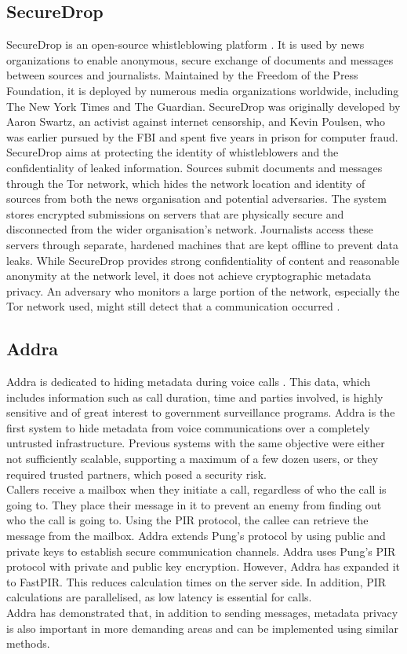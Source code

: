 \documentclass[a4paper]{article}
\begin{document}
\subsection{SecureDrop}
SecureDrop \citep{securedrop} is an open-source whistleblowing platform \citep{berret2016guide}. It is used by news organizations to enable anonymous, secure exchange of documents and messages between sources and journalists. Maintained by the Freedom of the Press Foundation, it is deployed by numerous media organizations worldwide, including The New York Times and The Guardian. SecureDrop was originally developed by Aaron Swartz, an activist against internet censorship, and Kevin Poulsen, who was earlier pursued by the FBI and spent five years in prison for computer fraud. SecureDrop aims at protecting the identity of whistleblowers and the confidentiality of leaked information. Sources submit documents and messages through the Tor network, which hides the network location and identity of sources from both the news organisation and potential adversaries. The system stores encrypted submissions on servers that are physically secure and disconnected from the wider organisation's network. Journalists access these servers through separate, hardened machines that are kept offline to prevent data leaks.
While SecureDrop provides strong confidentiality of content and reasonable anonymity at the network level, it does not achieve cryptographic metadata privacy. An adversary who monitors a large portion of the network, especially the Tor network used, might still detect that a communication occurred \citep{securedropTraffic}.


\subsection{Addra}
Addra is dedicated to hiding metadata during voice calls \citep{Ahmad2021}. This data, which includes information such as call duration, time and parties involved, is highly sensitive and of great interest to government surveillance programs. Addra is the first system to hide metadata from voice communications over a completely untrusted infrastructure. Previous systems with the same objective were either not sufficiently scalable, supporting a maximum of a few dozen users, or they required trusted partners, which posed a security risk. \\
Callers receive a mailbox when they initiate a call, regardless of who the call is going to. They place their message in it to prevent an enemy from finding out who the call is going to. Using the PIR protocol, the callee can retrieve the message from the mailbox. 
Addra extends Pung's protocol by using public and private keys to establish secure communication channels. Addra uses Pung's PIR protocol with private and public key encryption. However, Addra has expanded it to FastPIR. This reduces calculation times on the server side. In addition, PIR calculations are parallelised, as low latency is essential for calls. \\
Addra has demonstrated that, in addition to sending messages, metadata privacy is also important in more demanding areas and can be implemented using similar methods. 
\end{document}
